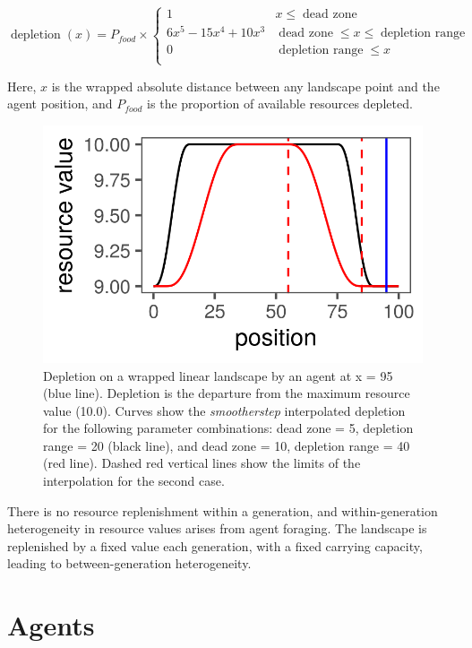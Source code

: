 \[ \operatorname{depletion}(x) = P_{food} \times \begin{cases}
1                    & x \le \operatorname{dead \ zone} \\
6x^5 - 15x^4 + 10x^3 & \operatorname{dead \ zone} \le x \le  \operatorname{depletion \ range} \\
0                    & \operatorname{depletion \ range} \le x \\
\end{cases} \]

Here, \(x\) is the wrapped absolute distance between any landscape point
and the agent position, and \(P_{food}\) is the proportion of available
resources depleted.

\begin{figure}
\centering
\includegraphics{fig_smootherstep.png}
\caption{Depletion on a wrapped linear landscape by an agent at x = 95
(blue line). Depletion is the departure from the maximum resource value
(10.0). Curves show the \emph{smootherstep} interpolated depletion for
the following parameter combinations: dead zone = 5, depletion range =
20 (black line), and dead zone = 10, depletion range = 40 (red line).
Dashed red vertical lines show the limits of the interpolation for the
second case.}
\end{figure}

There is no resource replenishment within a generation, and
within-generation heterogeneity in resource values arises from agent
foraging. The landscape is replenished by a fixed value each generation,
with a fixed carrying capacity, leading to between-generation
heterogeneity.

\hypertarget{agents}{%
\section{Agents}\label{agents}}

